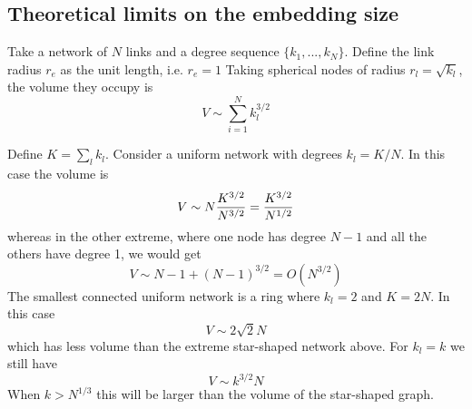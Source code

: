 \documentclass[nofootinbib,preprint,floatfix,titlepage,superscriptaddress]{revtex4} %
\newcommand{\outNim}[1]{}
\begin{document}
\outNim{
Experimenting with the size of nodes revealed that instead of taking the area to be proportional to the degree, doing so with the node volume yields better results. This may be because of the following. 

Suppose we have $k$ links of cross-section $a_e$. 
Assume that they are uniformly spread at different solid angles around a center that is the center of the circular cap at one end of them. 
The question is: what is the minimum radius of sphere around the same center which would cross the links in such a way that the cross-section of one link on the sphere's surface would not intersect other links' cross-section. 
Take the circular cross-section of one link with the sphere. Connecting the center of the sphere to this circle yields a cone, whose volume is $h a_e /3$, with $h=\sqrt{r^2- r_e^2}$ being the height of the cone. If the number of links is large and we work with the smallest radius at which links don't intersect, the total volume of these cones will be close to the volume of the sphere, $4\pi r^3/3$. Solving for $r$ yields
\[ {k\pi\over 3} r_e^2 h \approx {k\pi\over 3} r_e^2 r =  {4\pi\over 3} r^3 \quad \Rightarrow \quad r = {\sqrt{k} \over 2} r_e  \]
When $k \gg 1$ The links may cover the surface of the sphere and so $k \pi r_e^2 \approx 4 \pi r^2$, which also yields $r = \sqrt{k}r_e /2$.  
However, when $k$ is small, the volume of the cones is much smaller than the volume of the sphere. In fact for $k=1,2$ the volume of the cones is zero and their cross-section with the sphere becomes one of the great circles of the sphere. This means that 
\[ \pi r_e^2 = \pi r^2  \quad \Rightarrow \quad  r = r_e.\]
} %

\subsection{Theoretical limits on the embedding size}
Take a network of $N$ links and a degree sequence $\{k_1,...,k_N\}$. Define the link radius $r_e$ as the unit length, i.e. $r_e = 1$ Taking spherical nodes of radius $r_l = \sqrt{k_l}$, the volume they occupy is 
\[V \sim \sum_{i=1}^N k_l^{3/2}\]


Define $K= \sum_l k_l$. 
Consider 
a uniform network with degrees $k_l = K/N$. In this case the volume is 
\begin{equation}
    V \sim N {K^{3/2}\over N^{3/2}} = {K^{3/2}\over N^{1/2}} \label{eq:uniform}
\end{equation}
whereas in the other extreme, where one node has degree $N-1$ and all the others have degree 1, we would get
\[V \sim N-1+ (N-1)^{3/2} = O( N^{3/2})\]
The smallest connected uniform network is a ring where $k_l=2$ and $K = 2N$. In this case
\[V\sim 2\sqrt{2} N \]
which has less volume than the extreme star-shaped network above. For $k_l = k $ we still have 
\[V \sim k^{3/2} N \]
When $k > N^{1/3}$ this will be larger than the volume of the star-shaped graph.
\end{document}

